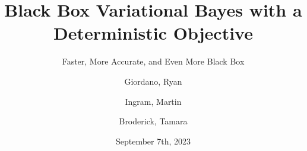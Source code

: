 \documentclass[8pt]{beamer}\usepackage[]{graphicx}\usepackage[]{color}
\begin{document}

\title{Black Box Variational Bayes with a Deterministic Objective}

\subtitle{Faster, More Accurate, and Even More Black Box} 
\date{September 7th, 2023}

\author{Giordano, Ryan  \and Ingram, Martin \and Broderick, Tamara}



\frame{\titlepage}

\end{document}
